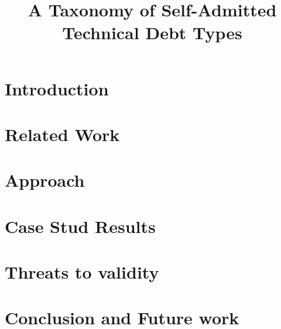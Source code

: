\documentclass[conference]{IEEEtran}
\begin{document}
\title{A Taxonomy of Self-Admitted Technical Debt Types}

\author{

}

\maketitle

\begin{abstract}
\end{abstract}

\IEEEpeerreviewmaketitle

\section{Introduction}
\label{sec:introduction}


\section{Related Work}
\label{sec:related_work}


\section{Approach}
\label{sec:approach}


\section{Case Stud Results}
\label{sec:results}


\section{Threats to validity}
\label{sec:threats_to_validity}


\section{Conclusion and Future work}
\label{sec:conclusion}




\end{document}
